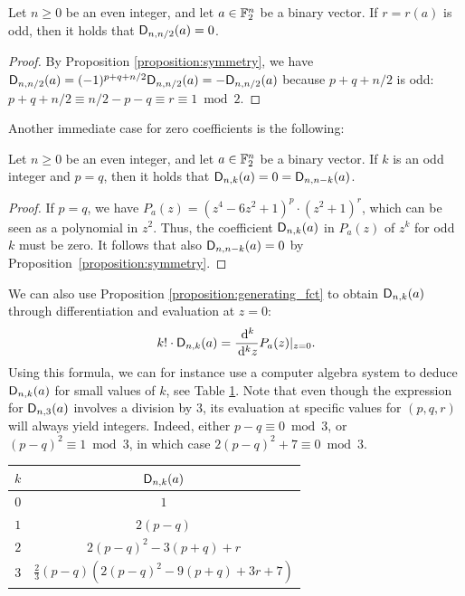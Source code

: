 \documentclass[11pt]{llncs}
\begin{document}
\begin{Corollary}
    Let $n\geq 0$ be an even integer, and let $a\in\mathbb{F}_2^n$ be a binary vector. If $r=r(a)$ is odd, then it holds that $\mathsf{D}_{n,n/2}(a)=0$.
\end{Corollary}

\begin{proof}
	By Proposition \ref{proposition:symmetry}, we have $\mathsf{D}_{n,n/2}(a)=(-1)^{p+q+n/2}\mathsf{D}_{n,n/2}(a)=-\mathsf{D}_{n,n/2}(a)$ because $p+q+n/2$ is odd: $p+q+n/2\equiv n/2-p-q\equiv r\equiv 1\bmod 2$.
\end{proof}

Another immediate case for zero coefficients is the following:


\begin{proposition}
    Let $n\geq 0$ be an even integer, and let $a\in\mathbb{F}_2^n$ be a binary vector. If $k$ is an odd integer and  $p=q$, then it holds that $\mathsf{D}_{n,k}(a)=0=\mathsf{D}_{n,n-k}(a)$.
\end{proposition}

\begin{proof}
    If $p=q$, we have $P_a(z)=(z^4-6z^2+1)^p\cdot(z^2+1)^r$, which can be seen as a polynomial in $z^2$. Thus, the coefficient $\mathsf{D}_{n,k}(a)$ in $P_a(z)$ of $z^k$ for odd $k$ must be zero. It follows that also $\mathsf{D}_{n,n-k}(a)=0$ by Proposition~\ref{proposition:symmetry}.
\end{proof}

\begin{remark}\label{remark:D_nka_differentiation}
    We can also use Proposition \ref{proposition:generating_fct} to obtain $\mathsf{D}_{n,k}(a)$ through differentiation and evaluation at $z=0$:
    \[
        k!\cdot\mathsf{D}_{n,k}(a)=\frac{\,\mathrm d^k}{\,\mathrm d^k z}P_a(z)\vert_{z=0}.
    \]
    Using this formula, we can for instance use a computer algebra system to deduce $\mathsf{D}_{n,k}(a)$ for small values of $k$, see Table \ref{tab:Dnka_small_k}. Note that even though the expression for $\mathsf{D}_{n,3}(a)$ involves a division by $3$, its evaluation at specific values for $(p,q,r)$ will always yield integers. Indeed, either $p-q\equiv 0\bmod 3$, or $(p-q)^2\equiv 1\bmod 3$, in which case $2(p-q)^2+7\equiv 0\bmod 3$.
\end{remark}
\begin{table}
    	\centering
    	\begin{tabular}{|c|c|}
    		\hline
    		$k$ & $\mathsf{D}_{n,k}(a)$\\ \hline
    		$0$&$1$\\
            $1$&$2(p-q)$\\ 
            $2$&$2(p-q)^2-3(p+q)+r$\\
            $3$&$\frac 23(p-q)\left(2(p-q)^2-9(p+q)+3r+7\right)$\\ \hline
    	\end{tabular}
    	\label{tab:Dnka_small_k}
    \end{table}
\end{document}
